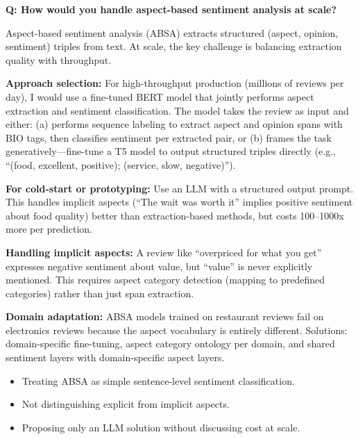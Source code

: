 \begin{interviewq}
\textbf{Q: How would you handle aspect-based sentiment analysis at scale?}

 \quad {} \quad \badgefreq{\freqmed}

\stronganswer
Aspect-based sentiment analysis (ABSA) extracts structured (aspect, opinion, sentiment)
triples from text.  At scale, the key challenge is balancing extraction quality with
throughput.

\textbf{Approach selection:}
For high-throughput production (millions of reviews per day), I would use a fine-tuned BERT
model that jointly performs aspect extraction and sentiment classification.  The model takes
the review as input and either: (a) performs sequence labeling to extract aspect and opinion
spans with BIO tags, then classifies sentiment per extracted pair, or (b) frames the task
generatively---fine-tune a T5 model to output structured triples directly (e.g.,
``(food, excellent, positive); (service, slow, negative)'').

\textbf{For cold-start or prototyping:} Use an LLM with a structured output prompt.  This
handles implicit aspects (``The wait was worth it'' implies positive sentiment about food
quality) better than extraction-based methods, but costs 100--1000x more per prediction.

\textbf{Handling implicit aspects:}  A review like ``overpriced for what you get'' expresses
negative sentiment about value, but ``value'' is never explicitly mentioned.  This requires
aspect category detection (mapping to predefined categories) rather than just span extraction.

\textbf{Domain adaptation:}  ABSA models trained on restaurant reviews fail on electronics
reviews because the aspect vocabulary is entirely different.  Solutions: domain-specific
fine-tuning, aspect category ontology per domain, and shared sentiment layers with
domain-specific aspect layers.

\redflags
\begin{itemize}
    \item Treating ABSA as simple sentence-level sentiment classification.
    \item Not distinguishing explicit from implicit aspects.
    \item Proposing only an LLM solution without discussing cost at scale.
\end{itemize}



\end{interviewq}

